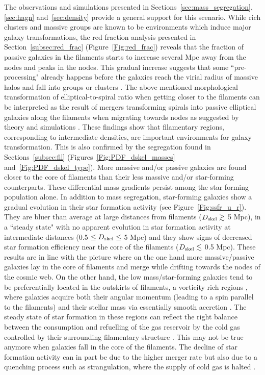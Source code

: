 \documentclass[useAMS,usenatbib]{mnras}
\newcommand{\hagn}{\mbox{{\sc \small Horizon-AGN}}}
\begin{document}
The observations and simulations presented in Sections~\ref{sec:mass_segregation}, \ref{sec:hagn} and~\ref{sec:density} provide a general support for this scenario. 
While rich clusters and massive groups are known to be environments which induce major galaxy transformations, the red fraction analysis presented in Section~\ref{subsec:red_frac} (Figure~\ref{Fig:red_frac}) reveals that the fraction of passive galaxies in the filaments starts to increase several Mpc away from the nodes and peaks in the nodes. This gradual increase suggests that some ``pre-processing" already happens before the galaxies reach the virial radius of massive halos and fall into groups or clusters \citep[e.g.][]{Porter2008, Martinez2016}. The above mentioned morphological transformation of elliptical-to-spiral ratio when getting closer to the filaments \citep[see also][]{Kuutma2017} can be interpreted as the result of mergers
transforming spirals into passive elliptical galaxies along the filaments when migrating towards nodes as suggested by theory and simulations \citep[][]{Codis2012,Dubois2014}. 
These findings show that  filamentary regions, corresponding to intermediate densities, are  important environments for galaxy transformation. This is also confirmed by the segregation found in Sections~\ref{subsec:fil} (Figures~\ref{Fig:PDF_dskel_masses} and~\ref{Fig:PDF_dskel_type}). More massive and/or passive galaxies are found closer to the core of filaments than their less massive and/or star-forming counterparts.
These differential mass gradients persist among the star forming population alone. In addition to mass segregation, star-forming galaxies show a gradual evolution in their star formation activity (see Figure~\ref{Fig:ssfr_u_r}). They are bluer than average at large distances from filaments ($D_{\rm skel} \gtrsim $ 5 Mpc), in a ``steady state" with no apparent evolution in star formation activity
at intermediate distances (0.5 $\le D_{\rm skel} \le$ 5 Mpc) and they show signs of decreased star formation efficiency near the core of the filaments ($ D_{\rm skel}\lesssim$ 0.5 Mpc).
These results are in line with the picture where on the one hand more massive/passive galaxies lay in the core of filaments and merge while drifting towards the nodes of the cosmic web. On the other hand, the low mass/star-forming galaxies tend to be preferentially located in the outskirts of filaments, a vorticity rich regions \citep{Laigle2015}, where galaxies acquire both their angular momentum (leading to a spin parallel to the filaments)  and their stellar mass  via essentially smooth accretion \citep[][also relying on \hagn]{Dubois2012a,Welker2017}. The steady state of star formation in these regions can reflect the right balance between the consumption and refuelling of the gas reservoir by the cold gas controlled by their surrounding filamentary structure \citep[as shown by][following \citealp{Pichon2011}, the outskirts of filaments are  the loci of most efficient helicoidal infall of cold gas]{Codis2015}. This may not be true anymore when galaxies fall in the core of the filaments. The decline of star formation activity can in part be due to the higher merger rate but also due to a quenching process such as strangulation, where the supply of cold gas is halted \citep[][]{Peng2015}. 
\end{document}
